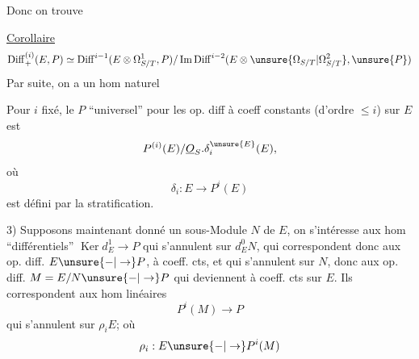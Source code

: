 Donc on trouve

\uline{Corollaire}
\[
\operatorname{Diff}^{(i)}_+(E,P)\simeq
\operatorname{Diff}^{i-1}(E\otimes\Omega^1_{S/T},P)/\operatorname{Im}\operatorname{Diff}^{i-2}(E\otimes\unsure{\Omega_{S/T}|\Omega^2_{S/T}},\unsure{P})
\]
Par suite, on a un hom naturel 

Pour $i$ fixé, le $P$ ``universel'' pour les op. diff à coeff constants (d'ordre $\leq i$) sur $E$ est
\[
P^{(i)}(E)/\underline{O}_S.\delta_i^{\unsure{E}}(E),
\]
où
\[
\delta_i:E\longrightarrow P^i(E)
\]
est défini par la stratification.

3) Supposons maintenant donné un sous-Module $N$ de $E$, on s'intéresse aux hom ``différentiels'' $\operatorname{Ker}d_E^1\to P$ qui s'annulent sur $d_E^0N$, qui correspondent donc aux op. diff. $E\unsure{\mathbin{-}|\to}P$, à coeff. cts, et qui s'annulent sur $N$, donc aux op. diff. $M=E/N\unsure{\mathbin{-}|\to}P$ qui  deviennent à coeff. cts sur $E$. Ils correspondent  aux hom linéaires
\[
P^i(M)\longrightarrow P
\]
qui s'annulent sur $\rho_iE$; où
\[
\rho_i:E\unsure{\mathbin{-}|\to}P^i(M)
\]
